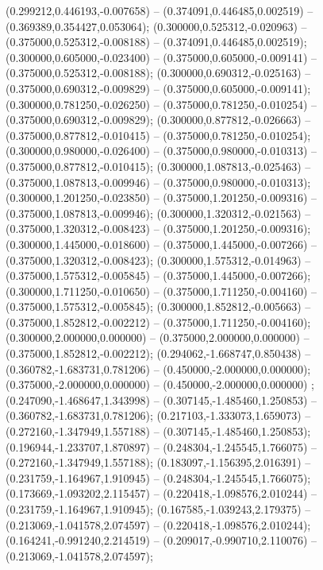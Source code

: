  (0.299212,0.446193,-0.007658) -- (0.374091,0.446485,0.002519) -- (0.369389,0.354427,0.053064);
 (0.300000,0.525312,-0.020963) -- (0.375000,0.525312,-0.008188) -- (0.374091,0.446485,0.002519);
 (0.300000,0.605000,-0.023400) -- (0.375000,0.605000,-0.009141) -- (0.375000,0.525312,-0.008188);
 (0.300000,0.690312,-0.025163) -- (0.375000,0.690312,-0.009829) -- (0.375000,0.605000,-0.009141);
 (0.300000,0.781250,-0.026250) -- (0.375000,0.781250,-0.010254) -- (0.375000,0.690312,-0.009829);
 (0.300000,0.877812,-0.026663) -- (0.375000,0.877812,-0.010415) -- (0.375000,0.781250,-0.010254);
 (0.300000,0.980000,-0.026400) -- (0.375000,0.980000,-0.010313) -- (0.375000,0.877812,-0.010415);
 (0.300000,1.087813,-0.025463) -- (0.375000,1.087813,-0.009946) -- (0.375000,0.980000,-0.010313);
 (0.300000,1.201250,-0.023850) -- (0.375000,1.201250,-0.009316) -- (0.375000,1.087813,-0.009946);
 (0.300000,1.320312,-0.021563) -- (0.375000,1.320312,-0.008423) -- (0.375000,1.201250,-0.009316);
 (0.300000,1.445000,-0.018600) -- (0.375000,1.445000,-0.007266) -- (0.375000,1.320312,-0.008423);
 (0.300000,1.575312,-0.014963) -- (0.375000,1.575312,-0.005845) -- (0.375000,1.445000,-0.007266);
 (0.300000,1.711250,-0.010650) -- (0.375000,1.711250,-0.004160) -- (0.375000,1.575312,-0.005845);
 (0.300000,1.852812,-0.005663) -- (0.375000,1.852812,-0.002212) -- (0.375000,1.711250,-0.004160);
 (0.300000,2.000000,0.000000) -- (0.375000,2.000000,0.000000) -- (0.375000,1.852812,-0.002212);
 (0.294062,-1.668747,0.850438) -- (0.360782,-1.683731,0.781206) -- (0.450000,-2.000000,0.000000);
 (0.375000,-2.000000,0.000000) -- (0.450000,-2.000000,0.000000) ;
 (0.247090,-1.468647,1.343998) -- (0.307145,-1.485460,1.250853) -- (0.360782,-1.683731,0.781206);
 (0.217103,-1.333073,1.659073) -- (0.272160,-1.347949,1.557188) -- (0.307145,-1.485460,1.250853);
 (0.196944,-1.233707,1.870897) -- (0.248304,-1.245545,1.766075) -- (0.272160,-1.347949,1.557188);
 (0.183097,-1.156395,2.016391) -- (0.231759,-1.164967,1.910945) -- (0.248304,-1.245545,1.766075);
 (0.173669,-1.093202,2.115457) -- (0.220418,-1.098576,2.010244) -- (0.231759,-1.164967,1.910945);
 (0.167585,-1.039243,2.179375) -- (0.213069,-1.041578,2.074597) -- (0.220418,-1.098576,2.010244);
 (0.164241,-0.991240,2.214519) -- (0.209017,-0.990710,2.110076) -- (0.213069,-1.041578,2.074597);
